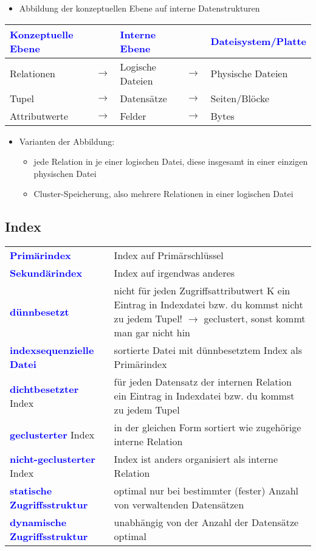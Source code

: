 \documentclass{scrartcl}
\newcommand{\key}[1]{{\textcolor{blue}{\textbf{#1}}}}
\begin{document}
\begin{itemize}
	\itemsep0em
	\item Abbildung der konzeptuellen Ebene auf interne Datenstrukturen
\end{itemize}

\begin{tabular}{|lclcl|}
	\hline
	\key{Konzeptuelle Ebene} && \key{Interne Ebene} && \key{Dateisystem/Platte} \\
	\hline
	Relationen & $\rightarrow$ & Logische Dateien & $\rightarrow$ & Physische Dateien \\
	Tupel & $\rightarrow$ & Datensätze & $\rightarrow$ & Seiten/Blöcke \\
	Attributwerte & $\rightarrow$ & Felder & $\rightarrow$ &  Bytes \\
	\hline
\end{tabular}

\begin{itemize}
	\itemsep0em
	\item Varianten der Abbildung:
	\begin{itemize}
		\item jede Relation in je einer logischen Datei, diese insgesamt in einer einzigen physischen Datei
		\item Cluster-Speicherung, also mehrere Relationen in einer logischen Datei
	\end{itemize}
\end{itemize}

\subsection{Index}

\begin{tabular}{lp{13cm}}
	\key{Primärindex} & Index auf Primärschlüssel\\
	\key{Sekundärindex} &Index auf irgendwas anderes \\
	\key{dünnbesetzt} & nicht für jeden Zugriffsattributwert K ein Eintrag in Indexdatei bzw. du kommst nicht zu jedem Tupel! $\rightarrow$ geclustert, sonst kommt man gar nicht hin\\
	\key{indexsequenzielle Datei} &  sortierte Datei mit dünnbesetztem Index als Primärindex \\
	\key{dichtbesetzter} Index & für jeden Datensatz der internen Relation ein Eintrag in Indexdatei bzw. du kommst zu jedem Tupel \\
	\key{geclusterter} Index & in der gleichen Form sortiert wie zugehörige interne Relation \\
	\key{nicht-geclusterter }Index & Index ist anders organisiert als interne Relation \\
	\key{statische Zugriffsstruktur} & optimal nur bei bestimmter (fester) Anzahl von verwaltenden Datensätzen \\
	\key{dynamische Zugriffsstruktur}  & unabhängig von der Anzahl der Datensätze optimal \\
\end{tabular}
\end{document}
